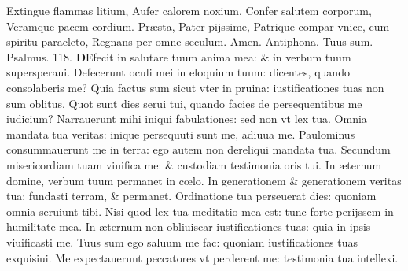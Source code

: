 \documentclass[a5paper,10pt]{book}
\def\ae{æ}
\def\oe{œ}
\begin{document}
\begin{multicols*}{2}
\newline \color{red} E\color{black}xtingue flammas litium, Aufer calorem noxium, Confer salutem corporum, Veramque pacem cordium.
\newline \color{red} P\color{black}r\ae sta, Pater pijssime, Patrique compar vnice, cum spiritu paracleto, Regnans per omne seculum. Amen. 
\newline \color{red} Antiphona. \color{black} Tuus sum. \color{red} Psalmus. \hypertarget{ps118.6}{118.} \color{black}
\lettrine[lines=2]{\bfseries D}{}Efecit in salutare tuum anima mea: \& in verbum tuum supersperaui.\newline \color{red} D\color{black}efecerunt oculi mei in eloquium tuum: dicentes, quando consolaberis me?
\newline \color{red} Q\color{black}uia factus sum sicut vter in pruina: iustificationes tuas non sum oblitus.
\newline \color{red} Q\color{black}uot sunt dies serui tui, quando facies de persequentibus me iudicium?
\newline \color{red} N\color{black}arrauerunt mihi iniqui fabulationes: sed non vt lex tua.
\newline \color{red} O\color{black}mnia mandata tua veritas: inique persequuti sunt me, adiuua me.
\newline \color{red} P\color{black}aulominus consummauerunt me in terra: ego autem non dereliqui mandata tua.
\newline \color{red} S\color{black}ecundum misericordiam tuam viuifica me: \& custodiam testimonia oris tui.
\newline \color{red} I\color{black}n \ae ternum domine, verbum tuum permanet in c\oe lo.
\newline \color{red} I\color{black}n generationem \& generationem veritas tua: fundasti terram, \& permanet.
\newline \color{red} O\color{black}rdinatione tua perseuerat dies: quoniam omnia seruiunt tibi.
\newline \color{red} N\color{black}isi quod lex tua meditatio mea est: tunc forte perijssem in humilitate mea.
\newline \color{red} I\color{black}n \ae ternum non obliuiscar iustificationes tuas: quia in ipsis viuificasti me.
\newline \color{red} T\color{black}uus sum ego saluum me fac: quoniam iustificationes tuas exquisiui.
\newline \color{red} M\color{black}e expectauerunt peccatores vt perderent me: testimonia tua intellexi.

\end{multicols*}
\end{document}
